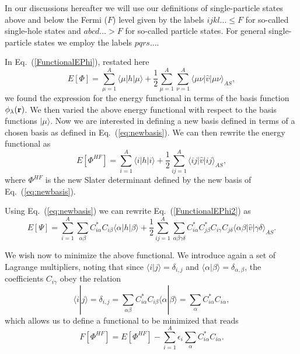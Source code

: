 \documentclass[graybox,sectrefs,envcountresetchap,open=right]{svmonodo}
\begin{document}
In our discussions hereafter we will use our definitions of single-particle states above and below the Fermi ($F$) level given by the labels
$ijkl\dots \le F$ for so-called single-hole states and $abcd\dots > F$ for so-called particle states.
For general single-particle states we employ the labels $pqrs\dots$. 




In Eq.~(\ref{FunctionalEPhi}), restated here
\[
  E[\Phi] 
  = \sum_{\mu=1}^A \langle \mu | h | \mu \rangle +
  \frac{1}{2}\sum_{{\mu}=1}^A\sum_{{\nu}=1}^A \langle \mu\nu|\hat{v}|\mu\nu\rangle_{AS},
\]
we found the expression for the energy functional in terms of the basis function $\phi_{\lambda}({\bf r})$. We then  varied the above energy functional with respect to the basis functions $|\mu \rangle$. 
Now we are interested in defining a new basis defined in terms of
a chosen basis as defined in Eq.~(\ref{eq:newbasis}). We can then rewrite the energy functional as
\begin{equation}
  E[\Phi^{HF}] 
  = \sum_{i=1}^A \langle i | h | i \rangle +
  \frac{1}{2}\sum_{ij=1}^A\langle ij|\hat{v}|ij\rangle_{AS}, \label{FunctionalEPhi2}
\end{equation}
where $\Phi^{HF}$ is the new Slater determinant defined by the new basis of Eq.~(\ref{eq:newbasis}). 


Using Eq.~(\ref{eq:newbasis}) we can rewrite Eq.~(\ref{FunctionalEPhi2}) as 
\begin{equation}
  E[\Psi] 
  = \sum_{i=1}^A \sum_{\alpha\beta} C^*_{i\alpha}C_{i\beta}\langle \alpha | h | \beta \rangle +
  \frac{1}{2}\sum_{ij=1}^A\sum_{{\alpha\beta\gamma\delta}} C^*_{i\alpha}C^*_{j\beta}C_{i\gamma}C_{j\delta}\langle \alpha\beta|\hat{v}|\gamma\delta\rangle_{AS}. \label{FunctionalEPhi3}
\end{equation}


We wish now to minimize the above functional. We introduce again a set of Lagrange multipliers, noting that
since $\langle i | j \rangle = \delta_{i,j}$ and $\langle \alpha | \beta \rangle = \delta_{\alpha,\beta}$, 
the coefficients $C_{i\gamma}$ obey the relation
\[
 \langle i | j \rangle=\delta_{i,j}=\sum_{\alpha\beta} C^*_{i\alpha}C_{i\beta}\langle \alpha | \beta \rangle=
\sum_{\alpha} C^*_{i\alpha}C_{i\alpha},
\]
which allows us to define a functional to be minimized that reads
\begin{equation}
  F[\Phi^{HF}]=E[\Phi^{HF}] - \sum_{i=1}^A\epsilon_i\sum_{\alpha} C^*_{i\alpha}C_{i\alpha}.
\end{equation}
\end{document}

